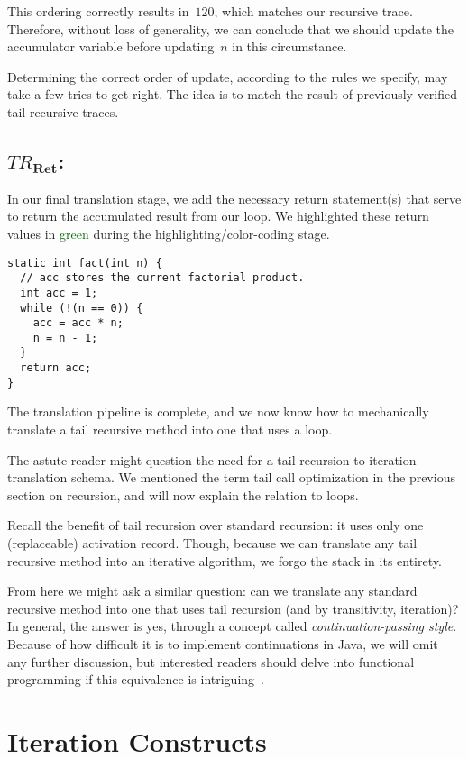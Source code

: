This ordering correctly results in~$120$, which matches our recursive trace. 
Therefore, without loss of generality, we can conclude that we should update the accumulator variable before updating~$n$ in this circumstance.

Determining the correct order of update, according to the rules we specify, may take a few tries to get right. The idea is to match the result of previously-verified tail recursive traces.

\subsection{\emph{$TR_\mathbf{Ret}$}:}
In our final translation stage, we add the necessary return statement(s) that serve to return the accumulated result from our loop. 
We highlighted these return values in \textcolor{darkgreen}{green} during the highlighting/color-coding stage.

\begin{lstlisting}[language=MyJava]
static int fact(int n) {
  // acc stores the current factorial product. 
  int acc = 1;
  while (!(n == 0)) { 
    acc = acc * n;
    n = n - 1;
  }
  return acc;
}
\end{lstlisting}

The translation pipeline is complete, and we now know how to mechanically translate a tail recursive method into one that uses a loop.

The astute reader might question the need for a tail recursion-to-iteration translation schema. 
We mentioned the term tail call optimization in the previous section on recursion, and will now explain the relation to loops.

Recall the benefit of tail recursion over standard recursion: it uses only one (replaceable) activation record. 
Though, because we can translate any tail recursive method into an iterative algorithm, we forgo the stack in its entirety.

From here we might ask a similar question: can we translate any standard recursive method into one that uses tail recursion (and by transitivity, iteration)? 
In general, the answer is yes, through a concept called \emph{continuation-passing style}. 
Because of how difficult it is to implement continuations in Java, we will omit any further discussion, but interested readers should delve into functional programming if this equivalence is intriguing~\citep{eopl, tls, schemetlp}.

\section{Iteration Constructs}

